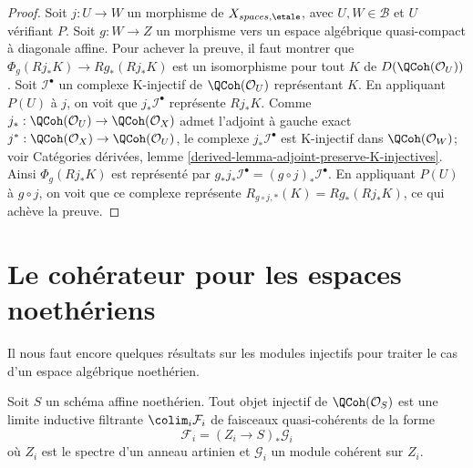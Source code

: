 \begin{proof}
\medskip\noindent
Soit $j : U \to W$ un morphisme de $X_{spaces, \etale}$, avec
$U,W \in \mathcal{B}$ et $U$ v\'erifiant $P$. Soit $g : W \to Z$ un
morphisme vers un espace alg\'ebrique quasi-compact \`a diagonale affine.
Pour achever la preuve, il faut montrer que
$\Phi_g(Rj_*K) \to Rg_*(Rj_*K)$
est un isomorphisme pour tout $K$ de $D(\QCoh(\mathcal{O}_U))$.
Soit $\mathcal{I}^\bullet$ un complexe K-injectif de
$\QCoh(\mathcal{O}_U)$ repr\'esentant $K$. En appliquant $P(U)$ \`a $j$, on
voit que $j_*\mathcal{I}^\bullet$ repr\'esente $Rj_*K$. Comme
$j_* : \QCoh(\mathcal{O}_U) \to \QCoh(\mathcal{O}_X)$ admet l'adjoint \`a
gauche exact $j^* : \QCoh(\mathcal{O}_X) \to \QCoh(\mathcal{O}_U)$, le
complexe $j_*\mathcal{I}^\bullet$ est K-injectif dans
$\QCoh(\mathcal{O}_W)$; voir Cat\'egories d\'eriv\'ees, lemme
\ref{derived-lemma-adjoint-preserve-K-injectives}. Ainsi
$\Phi_g(Rj_*K)$ est repr\'esent\'e par
$g_*j_*\mathcal{I}^\bullet = (g \circ j)_*\mathcal{I}^\bullet$.
En appliquant $P(U)$ \`a $g \circ j$, on voit que ce complexe repr\'esente
$R_{g \circ j, *}(K) = Rg_*(Rj_*K)$, ce qui ach\`eve la preuve.
\end{proof}









\section{Le coh\'erateur pour les espaces noeth\'eriens}
\label{section-coherator-Noetherian}

\noindent
Il nous faut encore quelques r\'esultats sur les modules injectifs pour traiter
le cas d'un espace alg\'ebrique noeth\'erien.

\begin{lemma}
\label{lemma-affine-injective-colimit-direct-sum-pushforwards-artin}
Soit $S$ un sch\'ema affine noeth\'erien. Tout objet injectif de
$\QCoh(\mathcal{O}_S)$ est une limite inductive filtrante
$\colim_i \mathcal{F}_i$ de faisceaux quasi-coh\'erents de la forme
$$
\mathcal{F}_i = (Z_i \to S)_*\mathcal{G}_i
$$
o\`u $Z_i$ est le spectre d'un anneau artinien et $\mathcal{G}_i$ un module
coh\'erent sur $Z_i$.
\end{lemma}

